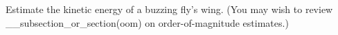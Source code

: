         Estimate the kinetic energy of a buzzing fly's wing.
(You may wish to review 
__subsection_or_section(oom) on order-of-magnitude estimates.)
